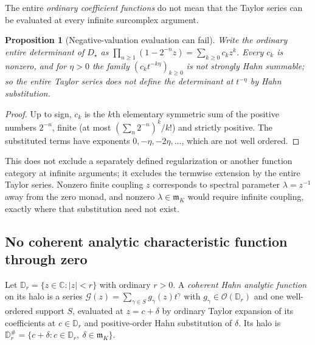 \documentclass[11pt,a4paper]{article}
\numberwithin{equation}{section}
\newtheorem{proposition}[proposition]{Proposition}
\theoremstyle{definition}
\theoremstyle{remark}
\newcommand{\C}{\mathbb C}
\newcommand{\mK}{\mathfrak m_K}
\newcommand{\abs}[1]{\lvert#1\rvert}
\begin{document}
The entire \emph{ordinary coefficient functions} do not mean that the
Taylor series can be evaluated at every infinite surcomplex argument.

\begin{proposition}[Negative-valuation evaluation can fail]\label{ihs:fr:prop:negeval}
Write the ordinary entire determinant of $D_\star$ as
$\prod_{n\ge1}(1-2^{-n}z)=\sum_{k\ge0}c_kz^k$. Every $c_k$ is nonzero, and
for $\eta>0$ the family $(c_kt^{-k\eta})_{k\ge0}$ is not strongly Hahn
summable; so the entire Taylor series does not define the determinant at
$t^{-\eta}$ by Hahn substitution.
\end{proposition}
\begin{proof}
Up to sign, $c_k$ is the $k$th elementary symmetric sum of the positive
numbers $2^{-n}$, finite (at most $(\sum_n2^{-n})^k/k!$) and strictly
positive. The substituted terms have exponents $0,-\eta,-2\eta,\ldots$, which
are not well ordered.
\end{proof}

This does not exclude a separately defined regularization or another function
category at infinite arguments; it excludes the termwise extension by the
entire Taylor series. Nonzero finite coupling $z$ corresponds to spectral parameter
$\lambda=z^{-1}$ away from the zero monad, and nonzero $\lambda\in\mK$ would
require infinite coupling, exactly where that substitution need not exist.

\subsection{No coherent analytic characteristic function through zero}\label{ihs:fr:sec:nochar}
Let $\mathbb D_r=\{z\in\C:\abs z<r\}$ with ordinary $r>0$. A \emph{coherent
Hahn analytic function} on its halo is a series
$\mathcal G(z)=\sum_{\gamma\in S}g_\gamma(z)t^\gamma$ with
$g_\gamma\in\mathcal O(\mathbb D_r)$ and one well-ordered support $S$,
evaluated at $z=c+\delta$ by ordinary Taylor expansion of its coefficients at
$c\in\mathbb D_r$ and positive-order Hahn substitution of $\delta$. Its halo
is $\mathbb D_r^\#=\{c+\delta:c\in\mathbb D_r,\ \delta\in\mK\}$.
\end{document}
